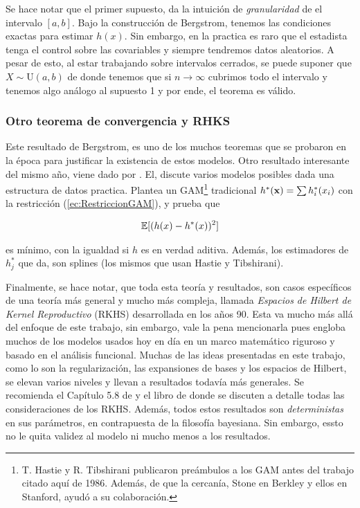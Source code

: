 \documentclass[../../Main/Main.tex]{subfiles}
\begin{document}
Se hace notar que el primer supuesto, da la intuición de \textit{granularidad} de el intervalo $[a,b]$. Bajo la construcción de Bergstrom, tenemos las condiciones exactas para estimar $h(x)$. Sin embargo, en la practica es raro que el estadista tenga el control sobre las covariables y siempre tendremos datos aleatorios. A pesar de esto, al estar trabajando sobre intervalos cerrados, se puede suponer que $X \sim \text{U}(a,b)$ de donde tenemos que si $n\to\infty$ cubrimos todo el intervalo y tenemos algo análogo al supuesto 1 y por ende, el teorema es válido. 

\subsubsection*{Otro teorema de convergencia y RHKS}

Este resultado de Bergstrom, es uno de los muchos teoremas que se probaron en la época para justificar la existencia de estos modelos. Otro resultado interesante del mismo año, viene dado por \autocite{stone1985additive}. El, discute varios modelos posibles dada una estructura de datos practica. Plantea un GAM\footnote{T. Hastie y R. Tibshirani publicaron preámbulos a los GAM antes del trabajo citado aquí de 1986. Además, de que la cercanía, Stone en Berkley y ellos en Stanford, ayudó a su colaboración.} tradicional $h^*(\mathbf{x}) = \sum h_i^*(x_i)$ con la restricción (\ref{ec:RestriccionGAM}), y prueba que

\begin{align*}
	\mathbb{E}[(h(x) - h^*(x))^2] 
\end{align*}

es mínimo, con la igualdad si $h$ es en verdad aditiva. Además, los estimadores de $h_j^*$ que da, son splines (los mismos que usan Hastie y Tibshirani).

Finalmente, se hace notar, que toda esta teoría y resultados, son casos específicos de una teoría más general y mucho más compleja, llamada \textit{Espacios de Hilbert de Kernel Reproductivo} (RKHS) desarrollada en los años 90. Esta va mucho más allá del enfoque de este trabajo, sin embargo, vale la pena mencionarla pues engloba muchos de los modelos usados hoy en día en un marco matemático riguroso y basado en el análisis funcional. Muchas de las ideas presentadas en este trabajo, como lo son la regularización, las expansiones de bases y los espacios de Hilbert, se elevan varios niveles y llevan a resultados todavía más generales. Se recomienda el Capítulo 5.8 de \autocite{hastie2008elements} y el libro de \autocite{wahba1990splines} donde se discuten a detalle todas las consideraciones de los RKHS. Además, todos estos resultados son \textit{deterministas} en sus parámetros, en contrapuesta de la filosofía bayesiana. Sin embargo, essto no le quita validez al modelo ni mucho menos a los resultados. 

\end{document}
